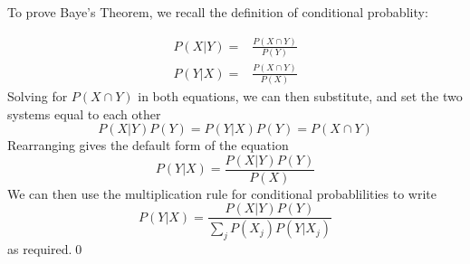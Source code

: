 To prove Baye's Theorem, we recall the definition of conditional probablity:

\begin{align*}
  P(X|Y) =& \frac{P(X\cap Y)}{P(Y)}\\
  P(Y|X) =& \frac{P(X\cap Y)}{P(X)}
\end{align*}
Solving for $P(X\cap Y)$ in both equations, we can then substitute, and set the two systems equal to each other
\begin{equation*}
  P(X|Y)P(Y) = P(Y|X)P(Y) = P(X\cap Y)
\end{equation*}
Rearranging gives the default form of the equation
\begin{equation*}
  P(Y|X) = \frac{P(X|Y)P(Y)}{P(X)}
\end{equation*}
We can then use the multiplication rule for conditional probablilities to write
\begin{equation}
  P(Y|X) = \frac{P(X|Y)P(Y)}{\sum_{j}P(X_{j})P(Y|X_{j})}
\end{equation}
as required.\qed
